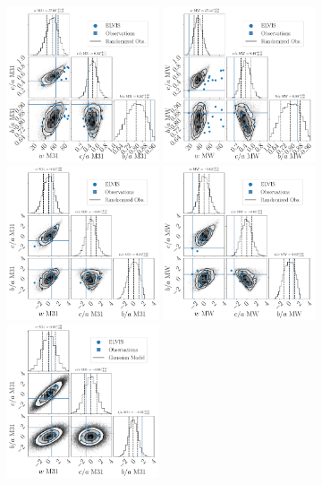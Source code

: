 \documentclass[a4paper,fleqn,usenatbib]{mnras}
\begin{document}
\begin{figure}
\centering
\includegraphics[width=0.40\textwidth]{input_elvis_obs_M31_n_11.pdf}
\includegraphics[width=0.40\textwidth]{input_elvis_obs_MW_n_11.pdf}
\includegraphics[width=0.40\textwidth]{input_elvis_obs_M31_n_11_normed.pdf}
\includegraphics[width=0.40\textwidth]{input_elvis_obs_MW_n_11_normed.pdf}
\includegraphics[width=0.40\textwidth]{gaussian_model_elvis_M31_n_11.pdf}

\end{figure}
\end{document}
